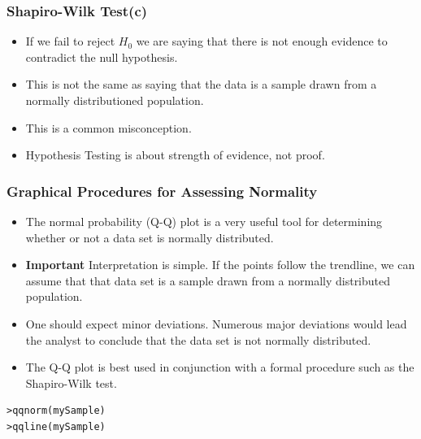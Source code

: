 \documentclass[a4]{beamer}
\begin{document}
\begin{frame}[fragile]
	\frametitle{Shapiro-Wilk Test(c)}
	
\begin{itemize}
	\item If we fail to reject $H_0$ we are saying that there is not enough evidence to contradict the null hypothesis. \smallskip
	\item This is not the same as saying that the data is a sample drawn from a normally distributioned population. \smallskip
	\item This is a common misconception.
	\item Hypothesis Testing is about strength of evidence, not proof.
\end{itemize}
	
	
\end{frame}


\begin{frame}[fragile]
\frametitle{Graphical Procedures for Assessing Normality}

\begin{itemize}
\item The normal probability (Q-Q) plot is a very useful tool for determining whether or not a data set is normally distributed.
\item \textbf{Important} Interpretation is simple. If the points follow the trendline, we can assume that that data set is a sample drawn from a normally distributed population.
\item One should expect minor deviations. Numerous major deviations would lead the analyst to conclude that the data set is not normally distributed.
\item The Q-Q plot is best used in conjunction with a formal procedure such as the Shapiro-Wilk test.
\end{itemize}

\begin{framed}
\begin{verbatim}
>qqnorm(mySample)
>qqline(mySample)
\end{verbatim}
\end{framed}
\end{frame}

\end{document}
